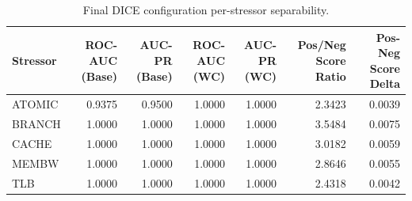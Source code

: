 \begin{table}[t]
\centering
\caption{Final DICE configuration per-stressor separability.}
\label{tab:dice_full_stressor}
\footnotesize
\begin{tabular}{lrrrrrr}
\toprule
Stressor & ROC-AUC (Base) & AUC-PR (Base) & ROC-AUC (WC) & AUC-PR (WC) & Pos/Neg Score Ratio & Pos-Neg Score Delta \\
\midrule
ATOMIC & 0.9375 & 0.9500 & 1.0000 & 1.0000 & 2.3423 & 0.0039 \\
BRANCH & 1.0000 & 1.0000 & 1.0000 & 1.0000 & 3.5484 & 0.0075 \\
CACHE & 1.0000 & 1.0000 & 1.0000 & 1.0000 & 3.0182 & 0.0059 \\
MEMBW & 1.0000 & 1.0000 & 1.0000 & 1.0000 & 2.8646 & 0.0055 \\
TLB & 1.0000 & 1.0000 & 1.0000 & 1.0000 & 2.4318 & 0.0042 \\
\bottomrule
\end{tabular}

\end{table}

